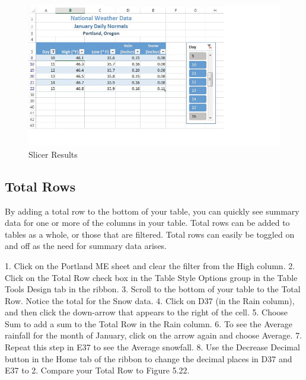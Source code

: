 \begin{figure}[H]
	\centering
	\includegraphics[width=\maxwidth{.95\linewidth}]{gfx/ch05_fig21}
	\caption{Slicer Results}
	\label{05:fig21}
\end{figure}





\subsection{Total Rows}

By adding a total row to the bottom of your table, you can quickly see summary data for one or more
of the columns in your table. Total rows can be added to tables as a whole, or those that are filtered.
Total rows can easily be toggled on and off as the need for summary data arises.

1. Click on the Portland ME sheet and clear the filter from the High column.
2. Click on the Total Row check box in the Table Style Options group in the Table Tools Design tab
in the ribbon.
3. Scroll to the bottom of your table to the Total Row. Notice the total for the Snow data.
4. Click on D37 (in the Rain column), and then click the down-arrow that appears to the right of
the cell.
5. Choose Sum to add a sum to the Total Row in the Rain column.
6. To see the Average rainfall for the month of January, click on the arrow again and choose
Average.
7. Repeat this step in E37 to see the Average snowfall.
8. Use the Decrease Decimal button in the Home tab of the ribbon to change the decimal places in
D37 and E37 to 2. Compare your Total Row to Figure 5.22.


